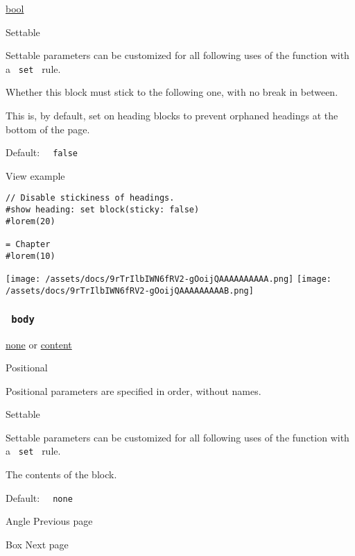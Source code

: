 \href{/docs/reference/foundations/bool/}{bool}

{{ Settable }}

\label{parameters-sticky-settable-tooltip}
Settable parameters can be customized for all following uses of the
function with a \texttt{\ set\ } rule.

Whether this block must stick to the following one, with no break in
between.

This is, by default, set on heading blocks to prevent orphaned headings
at the bottom of the page.

Default: \texttt{\ }{\texttt{\ false\ }}\texttt{\ }


View example

\begin{verbatim}
// Disable stickiness of headings.
#show heading: set block(sticky: false)
#lorem(20)

= Chapter
#lorem(10)
\end{verbatim}

\texttt{[image: /assets/docs/9rTrIlbIWN6fRV2-gOoijQAAAAAAAAAA.png]}
\texttt{[image: /assets/docs/9rTrIlbIWN6fRV2-gOoijQAAAAAAAAAB.png]}

\subsubsection{\texorpdfstring{\texttt{\ body\ }}{ body }}\label{parameters-body}

\href{/docs/reference/foundations/none/}{none} {or}
\href{/docs/reference/foundations/content/}{content}

{{ Positional }}

\label{parameters-body-positional-tooltip}
Positional parameters are specified in order, without names.

{{ Settable }}

\label{parameters-body-settable-tooltip}
Settable parameters can be customized for all following uses of the
function with a \texttt{\ set\ } rule.

The contents of the block.

Default: \texttt{\ }{\texttt{\ none\ }}\texttt{\ }

\href{/docs/reference/layout/angle/}{\pandocbounded{}}

{ Angle } { Previous page }

\href{/docs/reference/layout/box/}{\pandocbounded{}}

{ Box } { Next page }
